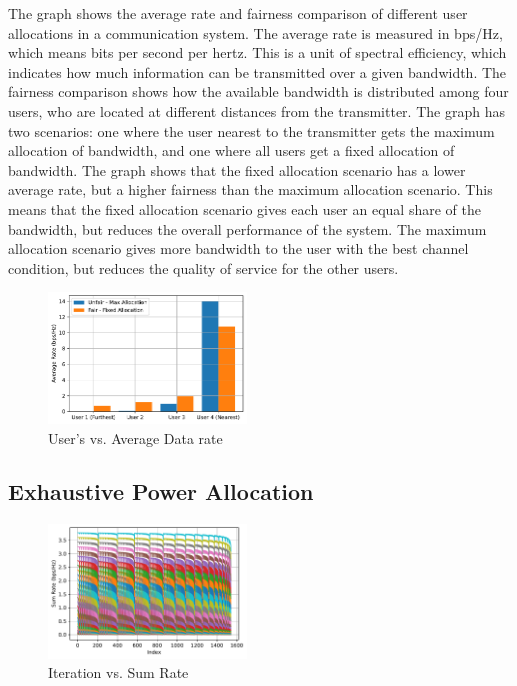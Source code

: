 \documentclass[conference]{IEEEtran}
\begin{document}
The graph shows the average rate and fairness comparison of different user allocations in a communication system. The average rate is measured in bps/Hz, which means bits per second per hertz. This is a unit of spectral efficiency, which indicates how much information can be transmitted over a given bandwidth. The fairness comparison shows how the available bandwidth is distributed among four users, who are located at different distances from the transmitter. The graph has two scenarios: one where the user nearest to the transmitter gets the maximum allocation of bandwidth, and one where all users get a fixed allocation of bandwidth. The graph shows that the fixed allocation scenario has a lower average rate, but a higher fairness than the maximum allocation scenario. This means that the fixed allocation scenario gives each user an equal share of the bandwidth, but reduces the overall performance of the system. The maximum allocation scenario gives more bandwidth to the user with the best channel condition, but reduces the quality of service for the other users. 

\begin{figure}[t!]
    \centering
    \includegraphics[width=0.47\textwidth , height= 0.35\textwidth]{figures/fairness_comparison.pdf}
    \caption{User's vs. Average Data rate}
\end{figure}

\subsection{Exhaustive Power Allocation}

\begin{figure}[b!]
    \centering
    \includegraphics[width=0.47\textwidth]{figures/sumrate_vs_index.pdf}
    \caption{Iteration vs. Sum Rate}
\end{figure}
\end{document}
